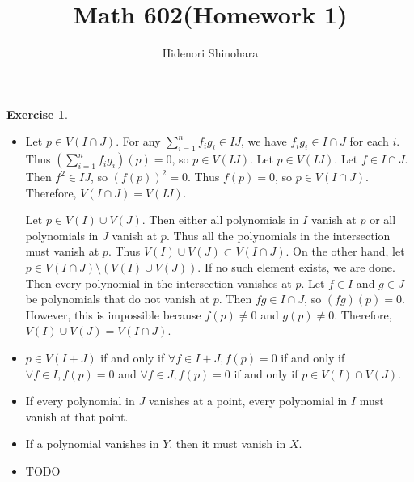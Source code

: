\documentclass[12pt, psamsfonts]{amsart}
\theoremstyle{definition}
\newtheorem*{exer}{Exercise}
\theoremstyle{remark}
\numberwithin{equation}{section}
\begin{document}
\title{Math 602(Homework 1)}
\author{Hidenori Shinohara}
\maketitle

\begin{exer}{1}
  \begin{itemize}
    \item
      Let $p \in V(I \cap J)$.
      For any $\sum_{i=1}^{n} f_ig_i \in IJ$, we have $f_ig_i \in I \cap J$ for each $i$.
      Thus $(\sum_{i=1}^{n} f_ig_i)(p) = 0$, so $p \in V(IJ)$.
      Let $p \in V(IJ)$.
      Let $f \in I \cap J$.
      Then $f^2 \in IJ$, so $(f(p))^2 = 0$.
      Thus $f(p) = 0$, so $p \in V(I \cap J)$.
      Therefore, $V(I \cap J) = V(IJ)$.

      Let $p \in V(I) \cup V(J)$.
      Then either all polynomials in $I$ vanish at $p$ or all polynomials in $J$ vanish at $p$.
      Thus all the polynomials in the intersection must vanish at $p$.
      Thus $V(I) \cup V(J) \subset V(I \cap J)$.
      On the other hand, let $p \in V(I \cap J) \setminus (V(I) \cup V(J))$.
      If no such element exists, we are done.
      Then every polynomial in the intersection vanishes at $p$.
      Let $f \in I$ and $g \in J$ be polynomials that do not vanish at $p$.
      Then $fg \in I \cap J$, so $(fg)(p) = 0$.
      However, this is impossible because $f(p) \ne 0$ and $g(p) \ne 0$.
      Therefore, $V(I) \cup V(J) = V(I \cap J)$.
    \item
      $p \in V(I + J)$ if and only if $\forall f \in I + J, f(p) = 0$
      if and only if $\forall f \in I, f(p) = 0$ and $\forall f \in J, f(p) = 0$ if and only if $p \in V(I) \cap V(J)$.
    \item
      If every polynomial in $J$ vanishes at a point, every polynomial in $I$ must vanish at that point.
    \item
      If a polynomial vanishes in $Y$, then it must vanish in $X$.
    \item
      TODO
  \end{itemize}
\end{exer}
\end{document}
